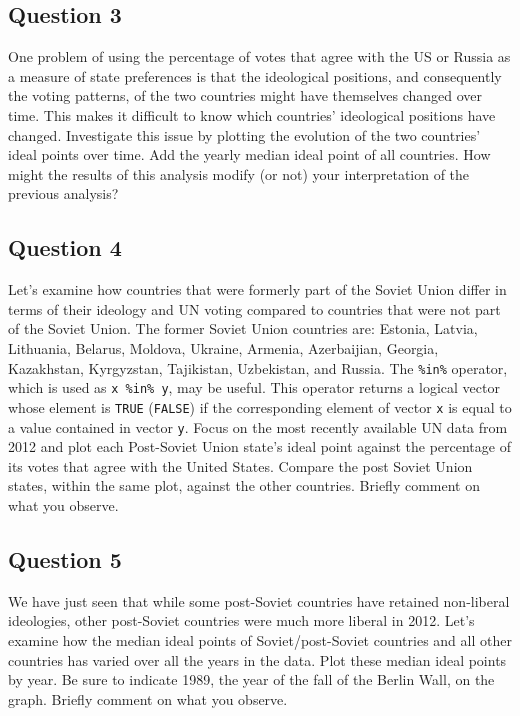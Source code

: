 \documentclass[]{article}
\begin{document}
\subsection{Question 3}\label{question-3}

One problem of using the percentage of votes that agree with the US or
Russia as a measure of state preferences is that the ideological
positions, and consequently the voting patterns, of the two countries
might have themselves changed over time. This makes it difficult to know
which countries' ideological positions have changed. Investigate this
issue by plotting the evolution of the two countries' ideal points over
time. Add the yearly median ideal point of all countries. How might the
results of this analysis modify (or not) your interpretation of the
previous analysis?

\subsection{Question 4}\label{question-4}

Let's examine how countries that were formerly part of the Soviet Union
differ in terms of their ideology and UN voting compared to countries
that were not part of the Soviet Union. The former Soviet Union
countries are: Estonia, Latvia, Lithuania, Belarus, Moldova, Ukraine,
Armenia, Azerbaijian, Georgia, Kazakhstan, Kyrgyzstan, Tajikistan,
Uzbekistan, and Russia. The \texttt{\%in\%} operator, which is used as
\texttt{x \%in\% y}, may be useful. This operator returns a logical
vector whose element is \texttt{TRUE} (\texttt{FALSE}) if the
corresponding element of vector \texttt{x} is equal to a value contained
in vector \texttt{y}. Focus on the most recently available UN data from
2012 and plot each Post-Soviet Union state's ideal point against the
percentage of its votes that agree with the United States. Compare the
post Soviet Union states, within the same plot, against the other
countries. Briefly comment on what you observe.

\subsection{Question 5}\label{question-5}

We have just seen that while some post-Soviet countries have retained
non-liberal ideologies, other post-Soviet countries were much more
liberal in 2012. Let's examine how the median ideal points of
Soviet/post-Soviet countries and all other countries has varied over all
the years in the data. Plot these median ideal points by year. Be sure
to indicate 1989, the year of the fall of the Berlin Wall, on the graph.
Briefly comment on what you observe.
\end{document}
